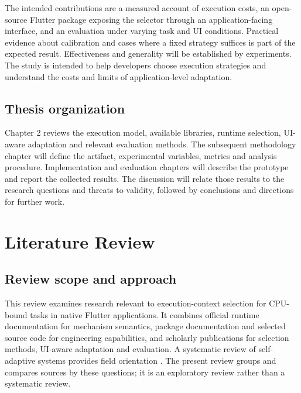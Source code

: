 \documentclass[14pt,a4paper,oneside]{extreport}
\begin{document}
The intended contributions are a measured account of execution costs, an open-source Flutter
package exposing the selector through an application-facing interface, and an evaluation under
varying task and UI conditions. Practical evidence about calibration and cases where a fixed
strategy suffices is part of the expected result. Effectiveness and generality will be
established by experiments. The study is intended to help developers choose execution
strategies and understand the costs and limits of application-level adaptation.

\section{Thesis organization}
\label{thesis-organization}

Chapter 2 reviews the execution model, available libraries, runtime selection, UI-aware
adaptation and relevant evaluation methods. The subsequent methodology chapter will define the
artifact, experimental variables, metrics and analysis procedure. Implementation and
evaluation chapters will describe the prototype and report the collected results. The
discussion will relate those results to the research questions and threats to validity,
followed by conclusions and directions for further work.
\chapter{Literature Review}
\label{literature-review}

\section{Review scope and approach}
\label{review-scope-and-approach}

This review examines research relevant to execution-context selection for CPU-bound tasks in
native Flutter applications. It combines official runtime documentation for mechanism
semantics, package documentation and selected source code for engineering capabilities, and
scholarly publications for selection methods, UI-aware adaptation and evaluation. A systematic
review of self-adaptive systems provides field orientation \citep{wong2022}. The present
review groups and compares sources by these questions; it is an exploratory review rather than
a systematic review.
\end{document}
